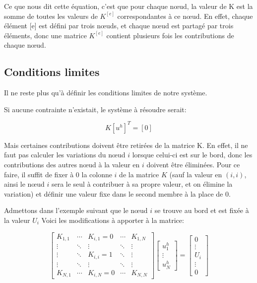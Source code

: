 \documentclass{article}
\begin{document}
Ce que nous dit cette équation, c'est que pour chaque nœud,
la valeur de K est la somme de toutes les valeurs de $K^{[e]}$
correspondantes à ce nœud. En effet, chaque élément [e] est
défini par trois nœuds, et chaque nœud est partagé par trois
éléments, donc une matrice $K^{[e]}$ contient
plusieurs fois les contributions de chaque nœud.

\subsection{Conditions limites}

Il ne reste plus qu'à définir les conditions limites de notre système.

Si aucune contrainte n'existait, le système à résoudre serait:

\begin{equation}
    K \left[u^h\right]^T = \left[0\right]
\end{equation}

Mais certaines contributions doivent être retirées de la matrice K.
En effet, il ne faut pas calculer les variations du nœud $i$ lorsque
celui-ci est sur le bord, donc les contributions des autres nœud
à la valeur en $i$ doivent être éliminées. Pour ce faire, il suffit
de fixer à $0$ la colonne $i$ de la matrice $K$
(sauf la valeur en $(i, i)$, ainsi le nœud $i$ sera le seul à contribuer
à sa propre valeur, et on élimine la variation) et définir une valeur
fixe dans le second membre à la place de $0$.

Admettons dans l'exemple suivant que le nœud $i$ se trouve au bord et
est fixée à la valeur $U_i$
Voici les modifications à apporter à la matrice:

\begin{equation}
    \begin{bmatrix}
        K_{1,1} & \cdots & K_{i,1} = 0 & \cdots & K_{1,N} \\
        \vdots & \ddots & \vdots & \ddots & \vdots \\
        \vdots & \ddots & K_{i,i} = 1 & \ddots & \vdots \\
        \vdots & \ddots & \vdots & \ddots & \vdots \\
        K_{N,1} & \cdots & K_{i,N}=0 & \cdots & K_{N,N}
    \end{bmatrix}
    \begin{bmatrix}
        u^h_1 \\ \vdots \\ u^h_N
    \end{bmatrix}
    =
    \begin{bmatrix}
        0 \\ \vdots \\ U_i \\ \vdots \\ 0
    \end{bmatrix}
\end{equation}
\end{document}
